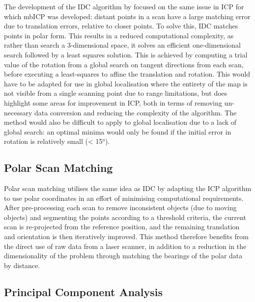 \documentclass[authoryearcitations]{UoYCSproject}
\begin{document}
The development of the IDC algorithm by \citet{Lu1997-zv} focused on the same issue in ICP for which mbICP was developed: distant points in a scan have a large matching error due to translation errors, relative to closer points. To solve this, IDC matches points in polar form. This results in a reduced computational complexity, as rather than search a 3-dimensional space, it solves an efficient one-dimensional search followed by a least squares solution. This is achieved by computing a trial value of the rotation from a global search on tangent directions from each scan, before executing a least-squares to affine the translation and rotation. This would have to be adapted for use in global localisation where the entirety of the map is not visible from a single scanning point due to range limitations, but does highlight some areas for improvement in ICP, both in terms of removing un-necessary data conversion and reducing the complexity of the algorithm. The method would also be difficult to apply to global localisation due to a lack of global search: an optimal minima would only be found if the initial error in rotation is relatively small (< 15$^o$).


\subsection{Polar Scan Matching}
\label{subsec:psm}
Polar scan matching \citet{Albert_Diosi2005-iw} utilises the same idea as IDC by adapting the ICP algorithm to use polar coordinates in an effort of minimising computational requirements. After pre-processing each scan to remove inconsistent objects (due to moving objects) and segmenting the points according to a threshold criteria, the current scan is re-projected from the reference position, and the remaining translation and orientation is then iteratively improved. This method therefore benefits from the direct use of raw data from a laser scanner, in addition to a reduction in the dimensionality of the problem through matching the bearings of the polar data by distance. 


\subsection{Principal Component Analysis}
\end{document}
